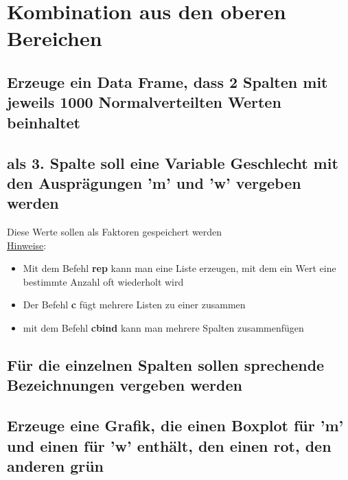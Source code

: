 \documentclass{article}
\begin{document}

\section{Kombination aus den oberen Bereichen}

\subsection{Erzeuge ein Data Frame, dass 2 Spalten mit jeweils 1000 Normalverteilten Werten beinhaltet}

\subsection{als 3. Spalte soll eine Variable Geschlecht mit den Ausprägungen 'm' und 'w' vergeben werden}

Diese Werte sollen als Faktoren gespeichert werden \\

\underline{Hinweise}:
\begin{itemize}
	\item Mit dem Befehl \textbf{rep} kann man eine Liste erzeugen, mit dem ein Wert eine bestimmte Anzahl oft wiederholt wird
	\item Der Befehl \textbf{c} fügt mehrere Listen zu einer zusammen
	\item mit dem Befehl \textbf{cbind} kann man mehrere Spalten zusammenfügen
\end{itemize}

\subsection{Für die einzelnen Spalten sollen sprechende Bezeichnungen vergeben werden}

\subsection{Erzeuge eine Grafik, die einen Boxplot für 'm' und einen für 'w' enthält, den einen rot, den anderen grün}
\end{document}

